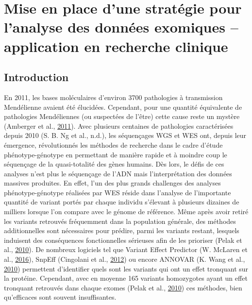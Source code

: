 \documentclass[12pt,twoside]{reedthesis}
\theoremstyle{definition}
\theoremstyle{definition}
\theoremstyle{remark}
\begin{document}
  \chapter{Mise en place d'une stratégie pour l'analyse des données
  exomiques -- application en recherche
  clinique}\label{mise-en-place-dune-strategie-pour-lanalyse-des-donnees-exomiques-application-en-recherche-clinique}
  
  \newpage
  
  \section{Introduction}\label{introduction}
  
  En 2011, les bases moléculaires d'environ 3700 pathologies à
  transmission Mendélienne avaient été élucidées. Cependant, pour une
  quantité équivalente de pathologies Mendéliennes (ou suspectées de
  l'être) cette cause reste un mystère (Amberger et al.,
  \protect\hyperlink{ref-Amberger2011}{2011}). Avec plusieurs centaines de
  pathologies caractérisées depuis 2010 (S. B. Ng et al., n.d.), les
  séquençages WGS et WES ont, depuis leur émergence, révolutionnés les
  méthodes de recherche dans le cadre d'étude phénotype-génotype en
  permettant de manière rapide et à moindre coup le séquençage de la
  quasi-totalité des gènes humains. Dès lors, le défis de ces analyses
  n'est plus le séquençage de l'ADN mais l'interprétation des données
  massives produites. En effet, l'un des plus grands challenges des
  analyses phénotype-génotype réalisées par WES réside dans l'analyse de
  l'importante quantité de variant portés par chaque individu s'élevant à
  plusieurs dizaines de milliers lorsque l'on compare avec le génome de
  référence. Même après avoir retiré les variants retrouvés fréquemment
  dans la population générale, des méthodes additionnelles sont
  nécessaires pour prédire, parmi les variants restant, lesquels induisent
  des conséquences fonctionnelles sérieuses afin de les prioriser (Pelak
  et al., \protect\hyperlink{ref-Pelak2010}{2010}). De nombreux logiciels
  tel que Variant Effect Predictor (W. McLaren et al.,
  \protect\hyperlink{ref-McLaren2016}{2016}), SnpEff (Cingolani et al.,
  \protect\hyperlink{ref-Cingolani2012}{2012}) ou encore ANNOVAR (K. Wang
  et al., \protect\hyperlink{ref-Wang2010}{2010}) permettent d'identifier
  quels sont les variants qui ont un effet tronquant sur la protéine.
  Cependant, avec en moyenne 165 variants homozygotes ayant un effet
  tronquant retrouvés dans chaque exomes (Pelak et al.,
  \protect\hyperlink{ref-Pelak2010}{2010}) ces méthodes, bien qu'efficaces
  sont souvent insuffisantes.
  
\end{document}
